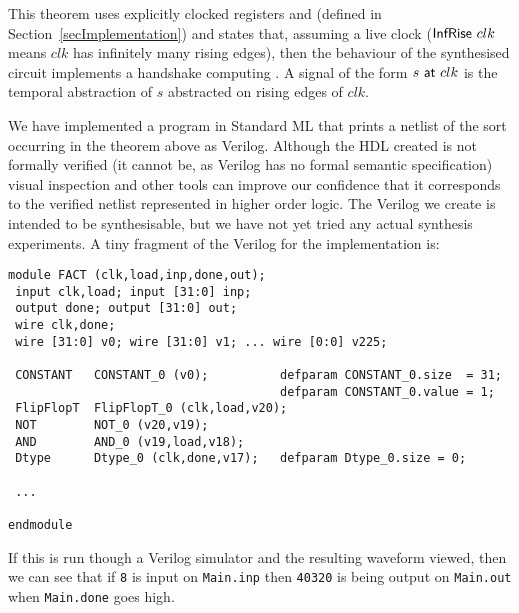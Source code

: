\documentclass{llncs}
\begin{document}

This theorem uses explicitly clocked registers  and
 (defined in Section~\ref{secImplementation}) and states
that, assuming a live clock ($\mathsf{InfRise}~clk$ means $clk$
has infinitely many rising edges), then the behaviour of the
synthesised circuit implements a handshake computing
. A signal of the form $s~\mathsf{at}~clk$ is the temporal abstraction
of $s$ abstracted on rising edges of $clk$.

We have implemented a program in Standard ML that prints a netlist of
the sort occurring in the theorem above as Verilog. Although the HDL created is not
formally verified (it cannot be, as Verilog has no formal semantic
specification) visual inspection and other tools can improve our
confidence that it corresponds to the verified netlist
represented in higher order logic. The Verilog we create is intended
to be synthesisable, but we have not yet tried any actual synthesis
experiments. A tiny fragment of the Verilog for the 
implementation is:



{\footnotesize\baselineskip6pt\begin{verbatim}
module FACT (clk,load,inp,done,out);
 input clk,load; input [31:0] inp;
 output done; output [31:0] out;
 wire clk,done;
 wire [31:0] v0; wire [31:0] v1; ... wire [0:0] v225;

 CONSTANT   CONSTANT_0 (v0);          defparam CONSTANT_0.size  = 31;
                                      defparam CONSTANT_0.value = 1;
 FlipFlopT  FlipFlopT_0 (clk,load,v20);
 NOT        NOT_0 (v20,v19);
 AND        AND_0 (v19,load,v18);
 Dtype      Dtype_0 (clk,done,v17);   defparam Dtype_0.size = 0;

 ...

endmodule
\end{verbatim}}

\newpage

If this is run though a Verilog simulator and the
resulting waveform viewed, then we can see that if \texttt{8}
is input on \texttt{Main.inp} then \texttt{40320} is
being output on \texttt{Main.out} when \texttt{Main.done} goes high.

\vspace*{-24mm}


\mbox{}\hspace*{-5mm}
\end{document}
